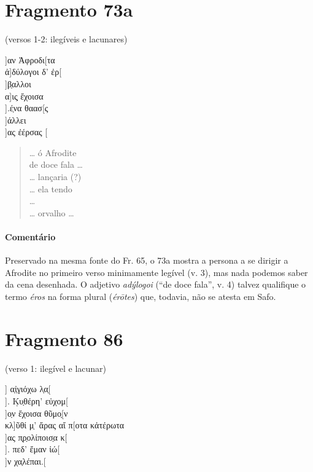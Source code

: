 \section{Fragmento 73a} 

\begin{gkverse}
\textnormal{(versos 1-2: ilegíveis e lacunares)}

]αν Ἀφροδι[τα\\
          ἀ]δύλογοι δ’ ἐρ[\\
        ]β̣αλλοι\\
      α]ις̣ ἔχοισα\\
     ].έ̣να θαασ[ς\\
     ]άλλει\\
     ]ας ἐέρσας [

\end{gkverse}

\begin{verse}
\ldots{} ó Afrodite\\
de doce fala \ldots{}\\
\ldots{} lançaria (?)\\
\ldots{} ela tendo\\
\ldots{}\\
\ldots{} orvalho \ldots{}\\
\end{verse}

{\paragraph{Comentário} Preservado na mesma fonte do Fr. 65, o 73a mostra a persona a se dirigir a Afrodite no primeiro verso minimamente legível (v. 3), mas nada podemos saber da cena desenhada. O adjetivo \textit{adýlogoi} (``de doce fala'', v. 4) talvez qualifique o termo \textit{éros} na forma plural (\textit{érōtes}) que, todavia, não se atesta em Safo.}

\pagebreak

\section{Fragmento 86}

\begin{gkverse}
\textnormal{(verso 1: ilegível e lacunar)}

] α̣ἰ̣γιόχω λ̣α̣[\\
]. Κ̣υ̣θέρη’ εὐχομ[\\
  ]ο̣ν ἔχοισα θῦμο̣[ν\\
κλ]ῦθί μ̣’ ἄρας αἴ π[οτα κἀτέρωτα\\
    ]ας π̣ρ̣ολίποισ̣α κ[\\
    ]. πεδ’ ἔμαν ἰώ[\\
        ]ν χα̣λέπαι.[

\end{gkverse}

